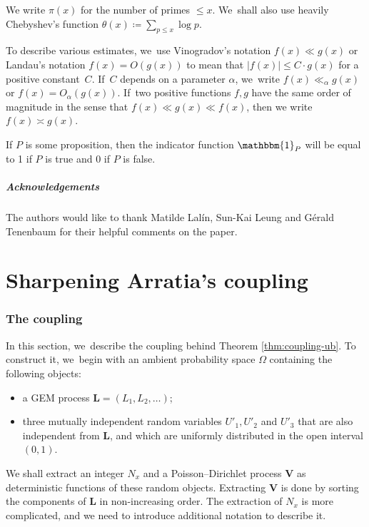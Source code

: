 \documentclass[10pt]{amsart}
\newcommand{\bL}{{\boldsymbol L}}
\newcommand{\bV}{{\boldsymbol V}}
\newcommand{\one}{\mathbbm{1}}
\newcommand{\bigoo}[1]{O\!\left(#1 \right)}
\newcommand{\abs}[1]{\left\lvert #1 \right\rvert}
\theoremstyle{plain}
\theoremstyle{definition}
\begin{document}
We write $\pi(x)$ for the number of primes $\le x$. We~shall also use heavily Chebyshev's function $\theta(x) \coloneqq \sum_{p\le x}\log p$.

To describe various estimates, we~use Vinogradov's notation $f(x) \ll g(x)$ or Landau's notation $f(x) = \bigoo{g(x)}$ to mean that $\abs{f(x)} \le C\cdot g(x)$ for a positive constant~$C$. If~$C$ depends on a parameter $\alpha$, we~write $f(x) \ll_\alpha g(x)$ or $f(x) = O_\alpha(g(x))$. If~two positive functions $f, g$ have the same order of magnitude in the sense that $f(x) \ll g(x) \ll f(x)$, then we write $f(x) \asymp g(x)$.

If $P$ is some proposition, then the indicator function $\one _P$ will be equal to 1 if $P$ is true and $0$ if $P$ is false.

\subsubsection*{Acknowledgements}
The authors would like to thank Matilde Lalín, Sun-Kai Leung and Gérald Tenenbaum for their helpful comments on the paper.

\part{Sharpening Arratia's coupling}\label{part:Arratia}

\section{The coupling}
\label{sec:coupling}

In this section, we~describe the coupling behind Theorem \ref{thm:coupling-ub}. To construct it, we~begin with an ambient probability space $\Omega$ containing the following objects:
\begin{itemize}
\item a GEM process $\bL = (L_1, L_2, \ldots)$;

\item three mutually independent random variables $U'_1, U'_2$ and $U'_3$ that are also independent from $\bL$, and which are uniformly distributed in the open interval $(0, 1)$.
\end{itemize}
We shall extract an integer $N_x$ and a Poisson--Dirichlet process $\bV$ as deterministic functions of these random objects. Extracting $\bV$ is done by sorting the components of $\bL$ in non-increasing order. The extraction of $N_x$ is more complicated, and we need to introduce additional notation to describe it.
\end{document}
